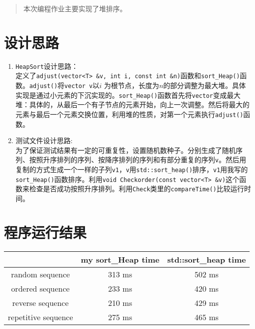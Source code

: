 \documentclass[UTF8]{ctexart}
\begin{document}
\pagestyle{fancy}
\fancyhead{}
\rhead{\today}
\begin{abstract}
	本次编程作业主要实现了堆排序。
\end{abstract}
\section{设计思路}
\begin{enumerate}
	\item
	\texttt{HeapSort}设计思路：\\
	定义了\texttt{adjust(vector<T> \&v, int i, const int \&n)}函数和\texttt{sort\_Heap()}函数。\texttt{adjust()}将\texttt{vector v}以$i$ 为根节点，长度为$n$的部分调整为最大堆。具体实现是通过小元素的下沉实现的。\texttt{sort\_Heap()}函数首先将\texttt{vector}变成最大堆：具体的，从最后一个有子节点的元素开始，向上一次调整。然后将最大的元素与最后一个元素交换位置，利用堆的性质，对第一个元素执行\texttt{adjust()}函数。
	\item 
	测试文件设计思路:\\
	为了保证测试结果有一定的可重复性，设置随机数种子。分别生成了随机序列、按照升序排列的序列、按降序排列的序列和有部分重复的序列\texttt{v}。然后用复制的方式生成一个一样的子列\texttt{v1}，\texttt{v}用\texttt{std::sort\_heap()}排序，\texttt{v1}用我写的\texttt{sort\_Heap()}函数排序。利用\texttt{void Checkorder(const vector<T> \&v)}这个函数来检查是否成功按照升序排列。利用\texttt{Check}类里的\texttt{compareTime()}比较运行时间。
\end{enumerate}
\section{程序运行结果}
\begin{center}
\begin{tabular}{|c|c|c|}
	\hline & my sort\_Heap time & std::sort\_heap time \\
	\hline random sequence & 313 ms & 502 ms \\
	\hline ordered sequence & 233 ms & 420 ms \\
	\hline reverse sequence & 210 ms & 429 ms \\
	\hline repetitive sequence & 275 ms & 465 ms \\
	\hline
\end{tabular}
\end{center}
\end{document}
